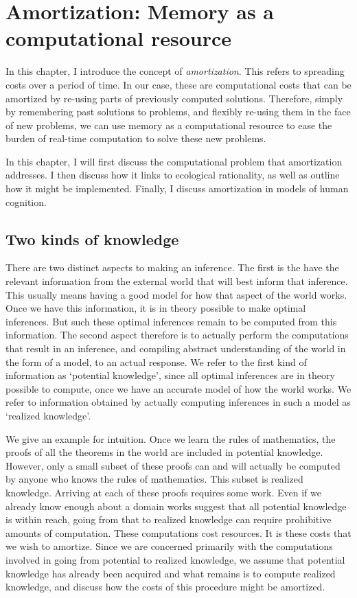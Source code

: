 \chapter{Amortization: Memory as a computational resource}
\label{chap:amort}

In this chapter, I introduce the concept of \textit{amortization}. This refers to spreading costs over a period of time. In our case, these are computational costs that can be amortized by re-using parts of previously computed solutions. Therefore, simply by remembering past solutions to problems, and flexibly re-using them in the face of new problems, we can use memory as a computational resource to ease the burden of real-time computation to solve these new problems. 

In this chapter, I will first discuss the computational problem that amortization addresses. I then discuss how it links to ecological rationality, as well as outline how it might be implemented. Finally, I discuss amortization in models of human cognition.

\section{Two kinds of knowledge}

There are two distinct aspects to making an inference. The first is the have the relevant information from the external world that will best inform that inference. This usually means having a good model for how that aspect of the world works. Once we have this information, it is in theory possible to make optimal inferences. But such these optimal inferences remain to be computed from this information. The second aspect therefore is to actually perform the computations that result in an inference, and compiling abstract understanding of the world in the form of a model, to an actual response. We refer to the first kind of information as `potential knowledge', since all optimal inferences are in theory possible to compute, once we have an accurate model of how the world works. We refer to information obtained by actually computing inferences in such a model as `realized knowledge'. 

We give an example for intuition. Once we learn the rules of mathematics, the proofs of all the theorems in the world are included in potential knowledge. However, only a small subset of these proofs can and will actually be computed by anyone who knows the rules of mathematics. This subset is realized knowledge. Arriving at each of these proofs requires some work. Even if we already know enough about a domain works suggest that all potential knowledge is within reach, going from that to realized knowledge can require prohibitive amounts of computation. These computations cost resources. It is these costs that we wish to amortize. Since we are concerned primarily with the computations involved in going from potential to realized knowledge, we assume that potential knowledge has already been acquired and what remains is to compute realized knowledge, and discuss how the costs of this procedure might be amortized.

